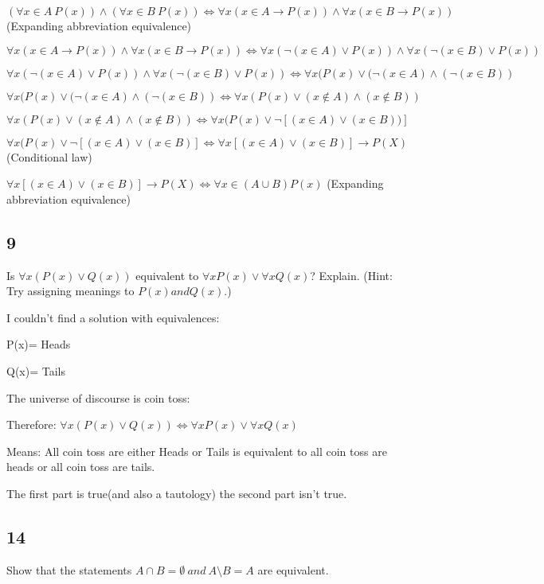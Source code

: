 \documentclass{article}
\begin{document}
$(\forall x \in A \ P(x)) \land (\forall x \in B  \ P(x))\Leftrightarrow \forall x (x\in A \rightarrow P(x)) \land \forall x (x\in B  \rightarrow P(x)) $ (Expanding abbreviation equivalence)

$\forall x (x\in A \rightarrow P(x)) \land \forall x (x\in B  \rightarrow P(x)) \Leftrightarrow \forall x (\neg (x\in A) \lor P(x)) \land \forall x (\neg (x\in B)  \lor P(x))$

$\forall x (\neg (x\in A) \lor P(x)) \land \forall x (\neg (x\in B)  \lor P(x)) \Leftrightarrow \forall x(P(x)\lor(\neg(x \in A)\land (\neg (x \in B))$

$\forall x(P(x)\lor(\neg(x \in A)\land (\neg (x \in B)) \Leftrightarrow \forall x(P(x)\lor(x \notin A)\land (x \notin B))$ 

$\forall x(P(x)\lor(x \notin A)\land (x \notin B)) \Leftrightarrow \forall x(P(x)\lor \neg[(x \in A)\lor (x \in B))]$

$\forall x(P(x)\lor \neg[(x \in A)\lor (x \in B)] \Leftrightarrow  \forall x[(x \in A)\lor (x \in B)]\rightarrow P(X)$ (Conditional law)

$\forall x[(x \in A)\lor (x \in B)]\rightarrow P(X) \Leftrightarrow \forall x \in (A \cup B) P(x)$ (Expanding abbreviation equivalence)
\subsection{9}
Is $\forall x(P(x) \lor Q(x))$ equivalent to $\forall xP(x) \lor \forall xQ(x)$? Explain. (Hint:
Try assigning meanings to $P(x) and Q(x).$)

I couldn't find a solution with equivalences:

P(x)= Heads

Q(x)= Tails

The universe of discourse is coin toss:

Therefore:
$\forall x(P(x) \lor Q(x))\Leftrightarrow \forall xP(x) \lor \forall xQ(x)$

Means: All coin toss are either Heads or Tails is equivalent to all coin toss are heads or all coin toss are tails.

The first part is true(and also a tautology) the second part isn't true. 

\subsection{14}
Show that the statements $A \cap B = \emptyset \ and  \ A \setminus B = A$ are equivalent.
\end{document}
